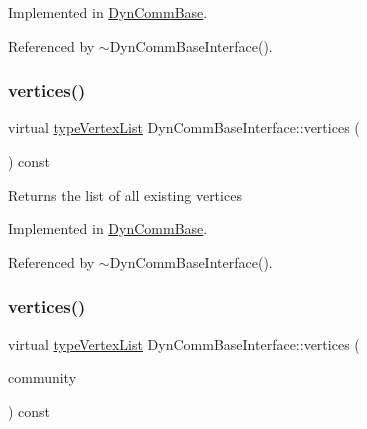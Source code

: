Implemented in \hyperlink{classDynCommBase_ae415f1a7792158845f69d6850b762d87}{Dyn\+Comm\+Base}.



Referenced by $\sim$\+Dyn\+Comm\+Base\+Interface().

\mbox{\label{classDynCommBaseInterface_af5023d7b81f4413cc8052df01067f71f}} 
\subsubsection{\texorpdfstring{vertices()}{vertices()}\hspace{0.1cm}{\footnotesize\ttfamily [1/2]}}
{\footnotesize\ttfamily virtual \hyperlink{graphInterface_8h_a21d54d8a139def524d3b0d6f71ec4974}{type\+Vertex\+List} Dyn\+Comm\+Base\+Interface\+::vertices (\begin{DoxyParamCaption}{ }\end{DoxyParamCaption}) const\hspace{0.3cm}{\ttfamily [pure virtual]}}

\begin{DoxyReturn}{Returns}
the list of all existing vertices 
\end{DoxyReturn}


Implemented in \hyperlink{classDynCommBase_ae240fba572935f26a72f73e39e115169}{Dyn\+Comm\+Base}.



Referenced by $\sim$\+Dyn\+Comm\+Base\+Interface().

\mbox{\label{classDynCommBaseInterface_ab178106e07cf3ad86ce2deb17dd5666e}} 
\subsubsection{\texorpdfstring{vertices()}{vertices()}\hspace{0.1cm}{\footnotesize\ttfamily [2/2]}}
{\footnotesize\ttfamily virtual \hyperlink{graphInterface_8h_a21d54d8a139def524d3b0d6f71ec4974}{type\+Vertex\+List} Dyn\+Comm\+Base\+Interface\+::vertices (\begin{DoxyParamCaption}\item[{\hyperlink{graphUndirectedGroupable_8h_a914da95c9ea7f14f4b7f875c36818556}{type\+Community}}]{community }\end{DoxyParamCaption}) const\hspace{0.3cm}{\ttfamily [pure virtual]}}

